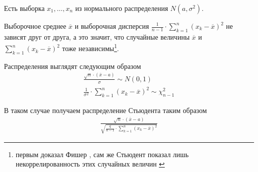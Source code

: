 \begin{example}
    Есть выборка $x_1, \dots, x_n$ из нормального распределения
    $N\left( a, \sigma^2 \right)$.

    Выборочное среднее $\overline{x}$ и выборочная дисперсия
    $\frac{1}{n-1} \cdot \sum_{k=1}^{n} \left( x_k - \overline{x} \right)^2$
    не зависят друг от друга, а это значит, что случайные величины
    $\overline{x}$ и $\sum_{k=1}^{n} \left( x_k - \overline{x} \right)^2$ тоже
    независимы\footnote{первым доказал Фишер \cite{FisherStudentApplication},
    сам же Стьюдент показал лишь некоррелированность этих случайных величин
    \cite{StudentProbableError}}.

    Распределения выглядят следующим образом
    \begin{align*}
        \frac{\sqrt{n} \cdot \left( \overline{x} - a \right)}{\sigma}
            \sim N\left( 0, 1 \right) \\
        \frac{1}{\sigma^2}
                \cdot \sum_{k=1}^{n}\left( x_k - \overline{x} \right)^2
                \sim \chi_{n-1}^2
    \end{align*}

    В таком случае получаем распределение Стьюдента таким образом
    \begin{align*}
        \frac{\sqrt{n} \cdot \left( \overline{x} - a \right)}{
            \sqrt{\frac{q}{n-1}
                \cdot \sum_{k=1}^{n}\left( x_k - \overline{x} \right)^2}}
    \end{align*}
\end{example}
